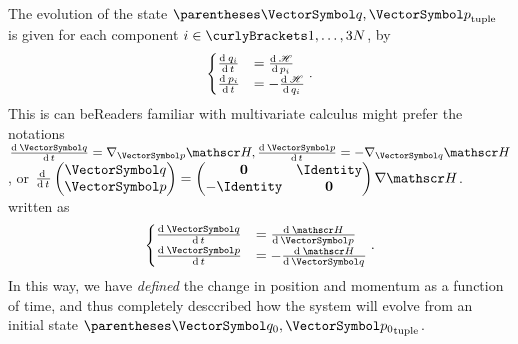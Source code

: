 \documentclass[10pt, a4paper, twoside]{basestyle}
\begin{document}
The evolution of the state $\tuple{\vq, \vp}$ is given for each component $i\in
\set{1,\dotsc,3N}$, by
\[
\begin{cases}
\deriv t {q_i} &= \deriv {p_i} \Hamiltonian \\
\deriv t {p_i} &= -\deriv {q_i} \Hamiltonian
\end{cases}.
\]
This is can be{Readers familiar with multivariate calculus might
prefer the notations $\deriv t {\vq} = \grad_{\vp} \Hamiltonian, \deriv t {\vp}
= -\grad_{\vq} \Hamiltonian$, or $\derivop t 
\begin{pmatrix}
\vq \\
\vp
\end{pmatrix} =
\begin{pmatrix}
\nullmat    & \Identity \\
-\Identity & \nullmat
\end{pmatrix}
\grad \Hamiltonian$.}
written as
\[
\begin{cases}
\deriv t {\vq} &= \deriv {\vp} \Hamiltonian \\
\deriv t {\vp} &= -\deriv {\vq} \Hamiltonian
\end{cases}.
\]
In this way, we have \emph{defined} the change in position and momentum as a
function of time, and thus completely desccribed how the system will evolve from
an initial state $\tuple{\vq_0, \vp_0}$.
\end{document}
